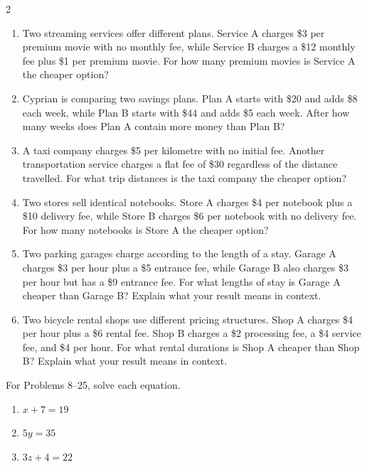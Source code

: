 \begin{multicols}{2}
\begin{enumerate}[label=\textbf{\arabic*.}]
			\item Two streaming services offer different plans. Service A charges
			\$3 per premium movie with no monthly fee, while Service B charges a
			\$12 monthly fee plus \$1 per premium movie. For how many premium movies
			is Service A the cheaper option?
			
			\item Cyprian is comparing two savings plans. Plan A starts with \$20 and
			adds \$8 each week, while Plan B starts with \$44 and adds \$5 each week.
			After how many weeks does Plan A contain more money than Plan B?
			
			\item A taxi company charges \$5 per kilometre with no initial fee.
			Another transportation service charges a flat fee of \$30 regardless of
			the distance travelled. For what trip distances is the taxi company the
			cheaper option?
			
			\item Two stores sell identical notebooks. Store A charges \$4 per notebook
			plus a \$10 delivery fee, while Store B charges \$6 per notebook with no
			delivery fee. For how many notebooks is Store A the cheaper option?
			
			\item Two parking garages charge according to the length of a stay.
			Garage A charges \$3 per hour plus a \$5 entrance fee, while Garage B
			also charges \$3 per hour but has a \$9 entrance fee. For what lengths
			of stay is Garage A cheaper than Garage B? Explain what your result means
			in context.
			
			\item Two bicycle rental shops use different pricing structures.
			Shop A charges \$4 per hour plus a \$6 rental fee. Shop B charges a
			\$2 processing fee, a \$4 service fee, and \$4 per hour. For what rental
			durations is Shop A cheaper than Shop B? Explain what your result means
			in context.
			
		\end{enumerate}
		
		For Problems 8--25, solve each equation. 
		
		\begin{enumerate}[label=\textbf{\arabic*.},start=9]
			\item $x+7=19$
			
			\item $5y=35$
			
			\item $3z+4=22$
			

\end{enumerate}
\end{multicols}
